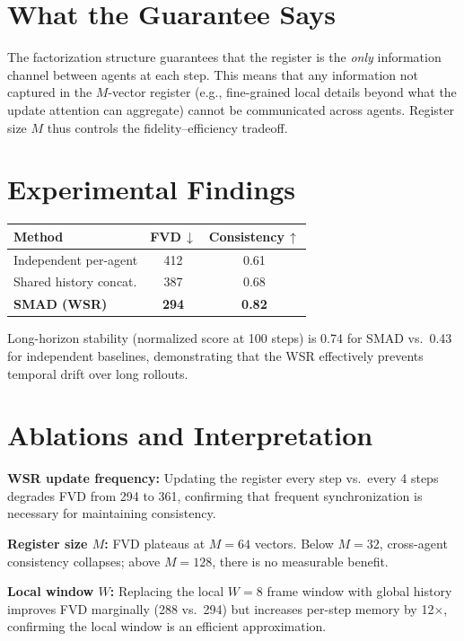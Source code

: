\documentclass[10pt,twocolumn]{article}
\begin{document}
\section{What the Guarantee Says}

The factorization structure guarantees that the register is the
\emph{only} information channel between agents at each step.
This means that any information not captured in the $M$-vector register
(e.g., fine-grained local details beyond what the update attention
can aggregate) cannot be communicated across agents. Register size $M$
thus controls the fidelity--efficiency tradeoff.

\section{Experimental Findings}

\begin{center}
\small
\begin{tabular}{lcc}
\toprule
Method & FVD\,$\downarrow$ & Consistency\,$\uparrow$ \\
\midrule
Independent per-agent & 412 & 0.61 \\
Shared history concat. & 387 & 0.68 \\
\textbf{SMAD (WSR)} & \textbf{294} & \textbf{0.82} \\
\bottomrule
\end{tabular}
\end{center}

Long-horizon stability (normalized score at 100 steps) is 0.74 for
SMAD vs.\ 0.43 for independent baselines, demonstrating that the
WSR effectively prevents temporal drift over long rollouts.

\section{Ablations and Interpretation}

\textbf{WSR update frequency:} Updating the register every step
vs.\ every 4 steps degrades FVD from 294 to 361, confirming that
frequent synchronization is necessary for maintaining consistency.

\textbf{Register size $M$:} FVD plateaus at $M = 64$ vectors.
Below $M = 32$, cross-agent consistency collapses; above $M = 128$,
there is no measurable benefit.

\textbf{Local window $W$:} Replacing the local $W = 8$ frame window
with global history improves FVD marginally (288 vs.\ 294) but
increases per-step memory by 12$\times$, confirming the local window
is an efficient approximation.
\end{document}
